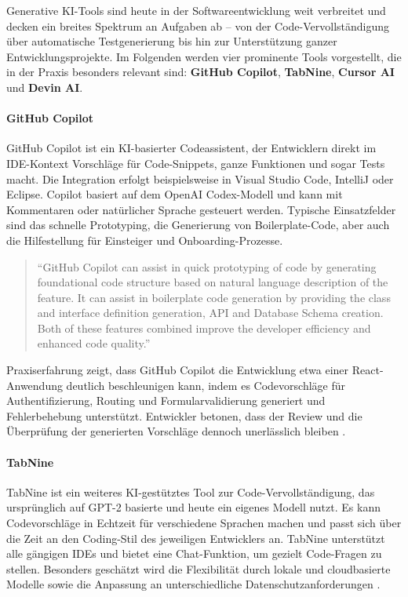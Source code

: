 Generative KI-Tools sind heute in der Softwareentwicklung weit verbreitet und
decken ein breites Spektrum an Aufgaben ab -- von der Code-Vervollständigung
über automatische Testgenerierung bis hin zur Unterstützung ganzer
Entwicklungsprojekte. Im Folgenden werden vier prominente Tools vorgestellt,
die in der Praxis besonders relevant sind: \textbf{GitHub Copilot},
\textbf{TabNine}, \textbf{Cursor AI} und \textbf{Devin AI}.

\paragraph{GitHub Copilot}
GitHub Copilot ist ein KI-basierter Codeassistent, der Entwicklern direkt im
IDE-Kontext Vorschläge für Code-Snippets, ganze Funktionen und sogar Tests
macht. Die Integration erfolgt beispielsweise in Visual Studio Code, IntelliJ
oder Eclipse. Copilot basiert auf dem OpenAI Codex-Modell und kann mit
Kommentaren oder natürlicher Sprache gesteuert werden. Typische Einsatzfelder
sind das schnelle Prototyping, die Generierung von Boilerplate-Code, aber auch
die Hilfestellung für Einsteiger und Onboarding-Prozesse.

\begin{quote}
    \enquote{GitHub Copilot can assist in quick prototyping of code by generating foundational code structure based on natural language description of the feature. It can assist in boilerplate code generation by providing the class and interface definition generation, API and Database Schema creation. Both of these features combined improve the developer efficiency and enhanced code quality.}
    \cite[S.~8]{donvir_role_2024}
\end{quote}

Praxiserfahrung zeigt, dass GitHub Copilot die Entwicklung etwa einer
React-Anwendung deutlich beschleunigen kann, indem es Codevorschläge für
Authentifizierung, Routing und Formularvalidierung generiert und Fehlerbehebung
unterstützt. Entwickler betonen, dass der Review und die Überprüfung der
generierten Vorschläge dennoch unerlässlich bleiben \cite{kerr_github_nodate}.

\paragraph{TabNine}
TabNine ist ein weiteres KI-gestütztes Tool zur Code-Vervollständigung, das
ursprünglich auf GPT-2 basierte und heute ein eigenes Modell nutzt. Es kann
Codevorschläge in Echtzeit für verschiedene Sprachen machen und passt sich über
die Zeit an den Coding-Stil des jeweiligen Entwicklers an. TabNine unterstützt
alle gängigen IDEs und bietet eine Chat-Funktion, um gezielt Code-Fragen zu
stellen. Besonders geschätzt wird die Flexibilität durch lokale und
cloudbasierte Modelle sowie die Anpassung an unterschiedliche
Datenschutzanforderungen \cite[S.~9]{donvir_role_2024}.

